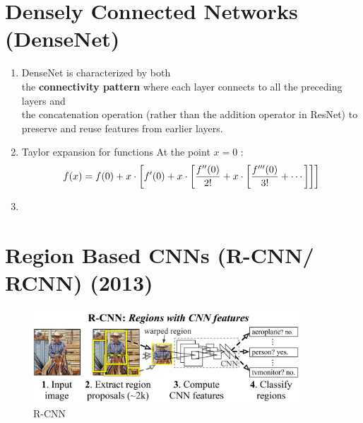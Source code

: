 \section{Densely Connected Networks (DenseNet) \cite{dnn-1}} \label{Densely Connected Networks (DenseNet)}

\begin{enumerate}[itemsep=0.2cm]
    \item DenseNet is characterized by both\\
    the \textbf{connectivity pattern} where each layer connects to all the preceding layers and\\
    the concatenation operation (rather than the addition operator in ResNet) to preserve and reuse features from earlier layers.

    \item Taylor expansion for functions At the point $x = 0$ :
    \[
        \hfill
        f(x) = f(0) + x \cdot \left[f'(0) + x \cdot \left[\frac{f''(0)}{2!}  + x \cdot \left[\frac{f'''(0)}{3!}  + \cdots \right]\right]\right]
        \hfill
    \]

    \item 
\end{enumerate}




















\section{Region Based CNNs (R-CNN/ RCNN) (2013) \cite{arxiv-1311.2524v5-rcnn,https://www.geeksforgeeks.org/r-cnn-region-based-cnns/}}\label{Region Based CNNs (R-CNN/ RCNN)}

\begin{figure}[H]
    \centering
    \includegraphics[width=\linewidth, height=3.5cm, keepaspectratio]{Pictures/convolutional-neural-network/rcnn-splash-method.jpg}
    \caption*{R-CNN}
\end{figure}

